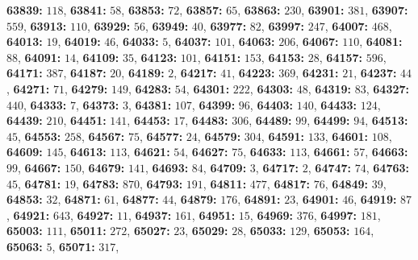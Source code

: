 \textsf{\bfseries 63839:} $118$, \textsf{\bfseries 63841:} $58$, \textsf{\bfseries 63853:} $72$, \textsf{\bfseries 63857:} $65$, \textsf{\bfseries 63863:} $230$, \textsf{\bfseries 63901:} $381$, \textsf{\bfseries 63907:} $559$, \textsf{\bfseries 63913:} $110$, \textsf{\bfseries 63929:} $56$, \textsf{\bfseries 63949:} $40$, \textsf{\bfseries 63977:} $82$, \textsf{\bfseries 63997:} $247$, \textsf{\bfseries 64007:} $468$, \textsf{\bfseries 64013:} $19$, \textsf{\bfseries 64019:} $46$, \textsf{\bfseries 64033:} $5$, \textsf{\bfseries 64037:} $101$, \textsf{\bfseries 64063:} $206$, \textsf{\bfseries 64067:} $110$, \textsf{\bfseries 64081:} $88$, \textsf{\bfseries 64091:} $14$, \textsf{\bfseries 64109:} $35$, \textsf{\bfseries 64123:} $101$, \textsf{\bfseries 64151:} $153$, \textsf{\bfseries 64153:} $28$, \textsf{\bfseries 64157:} $596$, \textsf{\bfseries 64171:} $387$, \textsf{\bfseries 64187:} $20$, \textsf{\bfseries 64189:} $2$, \textsf{\bfseries 64217:} $41$, \textsf{\bfseries 64223:} $369$, \textsf{\bfseries 64231:} $21$, \textsf{\bfseries 64237:} $44$, \textsf{\bfseries 64271:} $71$, \textsf{\bfseries 64279:} $149$, \textsf{\bfseries 64283:} $54$, \textsf{\bfseries 64301:} $222$, \textsf{\bfseries 64303:} $48$, \textsf{\bfseries 64319:} $83$, \textsf{\bfseries 64327:} $440$, \textsf{\bfseries 64333:} $7$, \textsf{\bfseries 64373:} $3$, \textsf{\bfseries 64381:} $107$, \textsf{\bfseries 64399:} $96$, \textsf{\bfseries 64403:} $140$, \textsf{\bfseries 64433:} $124$, \textsf{\bfseries 64439:} $210$, \textsf{\bfseries 64451:} $141$, \textsf{\bfseries 64453:} $17$, \textsf{\bfseries 64483:} $306$, \textsf{\bfseries 64489:} $99$, \textsf{\bfseries 64499:} $94$, \textsf{\bfseries 64513:} $45$, \textsf{\bfseries 64553:} $258$, \textsf{\bfseries 64567:} $75$, \textsf{\bfseries 64577:} $24$, \textsf{\bfseries 64579:} $304$, \textsf{\bfseries 64591:} $133$, \textsf{\bfseries 64601:} $108$, \textsf{\bfseries 64609:} $145$, \textsf{\bfseries 64613:} $113$, \textsf{\bfseries 64621:} $54$, \textsf{\bfseries 64627:} $75$, \textsf{\bfseries 64633:} $113$, \textsf{\bfseries 64661:} $57$, \textsf{\bfseries 64663:} $99$, \textsf{\bfseries 64667:} $150$, \textsf{\bfseries 64679:} $141$, \textsf{\bfseries 64693:} $84$, \textsf{\bfseries 64709:} $3$, \textsf{\bfseries 64717:} $2$, \textsf{\bfseries 64747:} $74$, \textsf{\bfseries 64763:} $45$, \textsf{\bfseries 64781:} $19$, \textsf{\bfseries 64783:} $870$, \textsf{\bfseries 64793:} $191$, \textsf{\bfseries 64811:} $477$, \textsf{\bfseries 64817:} $76$, \textsf{\bfseries 64849:} $39$, \textsf{\bfseries 64853:} $32$, \textsf{\bfseries 64871:} $61$, \textsf{\bfseries 64877:} $44$, \textsf{\bfseries 64879:} $176$, \textsf{\bfseries 64891:} $23$, \textsf{\bfseries 64901:} $46$, \textsf{\bfseries 64919:} $87$, \textsf{\bfseries 64921:} $643$, \textsf{\bfseries 64927:} $11$, \textsf{\bfseries 64937:} $161$, \textsf{\bfseries 64951:} $15$, \textsf{\bfseries 64969:} $376$, \textsf{\bfseries 64997:} $181$, \textsf{\bfseries 65003:} $111$, \textsf{\bfseries 65011:} $272$, \textsf{\bfseries 65027:} $23$, \textsf{\bfseries 65029:} $28$, \textsf{\bfseries 65033:} $129$, \textsf{\bfseries 65053:} $164$, \textsf{\bfseries 65063:} $5$, \textsf{\bfseries 65071:} $317$, 
